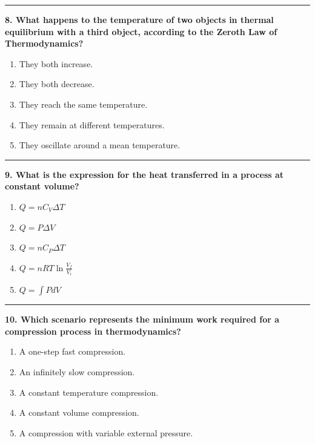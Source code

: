 \documentclass[
  9pt,
]{extbook}
\providecommand{\tightlist}{%
  \setlength{\itemsep}{0pt}\setlength{\parskip}{0pt}}
\theoremstyle{definition}
\theoremstyle{definition}
\theoremstyle{definition}
\theoremstyle{remark}
\begin{document}
\begin{center}\rule{0.5\linewidth}{0.5pt}\end{center}

\textbf{8. What happens to the temperature of two objects in thermal equilibrium with a third object, according to the Zeroth Law of Thermodynamics?}

\begin{enumerate}
\def\labelenumi{\alph{enumi}.}
\tightlist
\item
  They both increase.
\item
  They both decrease.
\item
  They reach the same temperature.
\item
  They remain at different temperatures.
\item
  They oscillate around a mean temperature.
\end{enumerate}

\begin{center}\rule{0.5\linewidth}{0.5pt}\end{center}

\textbf{9. What is the expression for the heat transferred in a process at constant volume?}

\begin{enumerate}
\def\labelenumi{\alph{enumi}.}
\tightlist
\item
  \(Q = nC_V \Delta T\)
\item
  \(Q = P \Delta V\)
\item
  \(Q = n C_P \Delta T\)
\item
  \(Q = nRT \ln \frac{V_f}{V_i}\)
\item
  \(Q = \int PdV\)
\end{enumerate}

\begin{center}\rule{0.5\linewidth}{0.5pt}\end{center}

\textbf{10. Which scenario represents the minimum work required for a compression process in thermodynamics?}

\begin{enumerate}
\def\labelenumi{\alph{enumi}.}
\tightlist
\item
  A one-step fast compression.
\item
  An infinitely slow compression.
\item
  A constant temperature compression.
\item
  A constant volume compression.
\item
  A compression with variable external pressure.
\end{enumerate}
\end{document}
